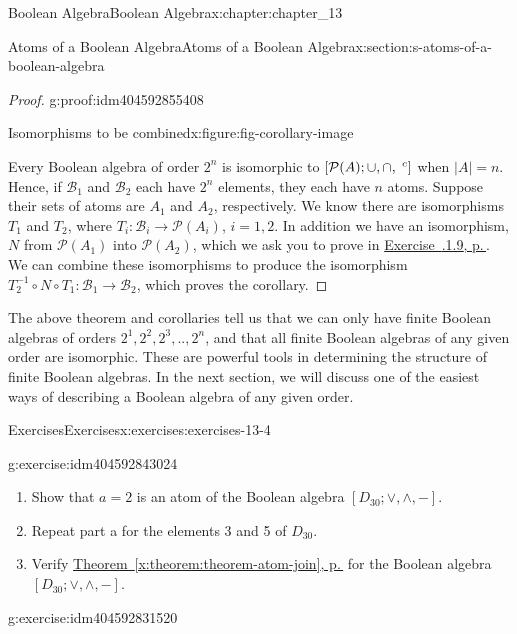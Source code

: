 \documentclass[twoside,10pt,]{book}
\newcommand{\xreffont}{\relax}
\numberwithin{equation}{section}
\begin{document}
\begin{chapterptx}{Boolean Algebra}{}{Boolean Algebra}{}{}{x:chapter:chapter_13}
\begin{sectionptx}{Atoms of a Boolean Algebra}{}{Atoms of a Boolean Algebra}{}{}{x:section:s-atoms-of-a-boolean-algebra}
\begin{proof}{}{g:proof:idm404592855408}
\begin{figureptx}{Isomorphisms to be combined}{x:figure:fig-corollary-image}{}
\begin{image}{0.325}{0.35}{0.325}
\end{image}%
\tcblower
\end{figureptx}%
Every Boolean algebra of order \(2^n\) is isomorphic to \([\mathcal{P}(A); \cup , \cap, \hspace{1 mm}^c ]\) when \(\lvert A \rvert= n\). Hence, if \(\mathcal{B}_1\) and \(\mathcal{B}_2\) each have \(2^n\) elements, they each have \(n\) atoms.  Suppose their sets of atoms are \(A_1\) and \(A_2\), respectively.  We know there are isomorphisms \(T_1\) and \(T_2\), where \(T_i:\mathcal{B}_i \to \mathcal{P}(A_i)\), \(i=1,2\).  In addition we have an isomorphism, \(N\) from \(\mathcal{P}(A_1)\) into \(\mathcal{P}(A_2)\), which we ask you to prove in \hyperlink{x:exercise:exercise-set-boolean-isomorphism}{Exercise~{\xreffont 13.4.1.9}, p.\,\pageref{x:exercise:exercise-set-boolean-isomorphism}}.  We can combine these isomorphisms to produce the isomorphism   \(T_{2}^{-1}\circ N \circ T_1:\mathcal{B}_1 \to \mathcal{B}_2\), which proves the corollary.%
\end{proof}
The above theorem and corollaries tell us that we can only have finite Boolean algebras of orders \(2^1, 2^2, 2^3,. . , 2^n\), and that all finite Boolean algebras of any given order are isomorphic. These are powerful tools in determining the structure of finite Boolean algebras. In the next section, we will discuss one of the easiest ways of describing a Boolean algebra of any given order.%
%
%
\typeout{************************************************}
\typeout{************************************************}
%
\begin{exercises-subsection}{Exercises}{}{Exercises}{}{}{x:exercises:exercises-13-4}
\begin{divisionexercise}{1}{}{}{g:exercise:idm404592843024}%
%
\begin{enumerate}[label=(\alph*)]
\item{}Show that \(a = 2\) is an atom of the Boolean algebra \(\left[D_{30}; \lor , \land, - \right]\).%
\item{}Repeat part a for the elements 3 and 5 of \(D_{30}\).%
\item{}Verify \hyperref[x:theorem:theorem-atom-join]{Theorem~{\xreffont\ref{x:theorem:theorem-atom-join}}, p.\,\pageref{x:theorem:theorem-atom-join}} for the Boolean algebra \(\left[D_{30}; \lor , \land, - \right]\).%
\end{enumerate}
%
\end{divisionexercise}%
\begin{divisionexercise}{2}{}{}{g:exercise:idm404592831520}%

\end{divisionexercise}
\end{exercises-subsection}
\end{sectionptx}
\end{chapterptx}
\end{document}
